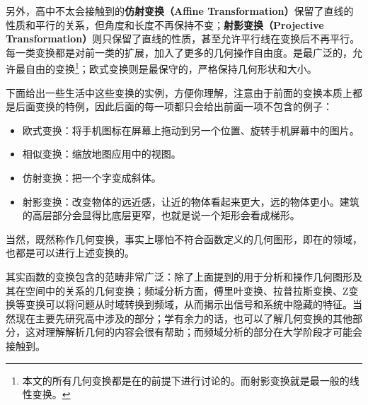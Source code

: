 另外，高中不太会接触到的\textbf{仿射变换（Affine Transformation）}保留了直线的性质和平行的关系，但角度和长度不再保持不变；\textbf{射影变换（Projective Transformation）}则只保留了直线的性质，甚至允许平行线在变换后不再平行。每一类变换都是对前一类的扩展，加入了更多的几何操作自由度。是最广泛的，允许最自由的变换\footnote{本文的所有几何变换都是在的前提下进行讨论的。而射影变换就是最一般的线性变换。}；欧式变换则是最保守的，严格保持几何形状和大小。

下面给出一些生活中这些变换的实例，方便你理解，注意由于前面的变换本质上都是后面变换的特例，因此后面的每一项都只会给出前面一项不包含的例子：

\begin{itemize}
\item 欧式变换：将手机图标在屏幕上拖动到另一个位置、旋转手机屏幕中的图片。
\item 相似变换：缩放地图应用中的视图。
\item 仿射变换：把一个字变成斜体。
\item 射影变换：改变物体的远近感，让近的物体看起来更大，远的物体更小。建筑的高层部分会显得比底层更窄，也就是说一个矩形会看成梯形。
\end{itemize}

当然，既然称作几何变换，事实上哪怕不符合函数定义的几何图形，即在的领域，也都是可以进行上述变换的。

其实函数的变换包含的范畴非常广泛：除了上面提到的用于分析和操作几何图形及其在空间中的关系的几何变换；频域分析方面，傅里叶变换、拉普拉斯变换、Z变换等变换可以将问题从时域转换到频域，从而揭示出信号和系统中隐藏的特征。当然现在主要先研究高中涉及的部分；学有余力的话，也可以了解几何变换的其他部分，这对理解解析几何的内容会很有帮助；而频域分析的部分在大学阶段才可能会接触到。
